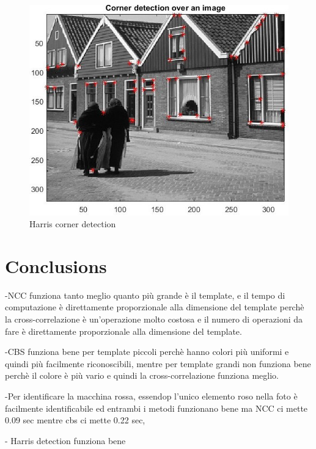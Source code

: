 \begin{figure}
	\centering
	\includegraphics[width=0.7\linewidth]{"mainmatter/Images/Corner detection over image"}
	\caption{Harris corner detection}
	\label{fig:corner-detection-over-image}
\end{figure}
\newpage
\section*{Conclusions}


-NCC funziona tanto meglio quanto più grande è il template, e il tempo di computazione è direttamente proporzionale alla dimensione del template perchè la cross-correlazione è un'operazione molto costosa e il numero di operazioni da fare è direttamente proporzionale alla dimensione del template.

-CBS funziona bene per template piccoli perchè hanno colori più uniformi e quindi più facilmente riconoscibili, mentre per template grandi non funziona bene perchè il colore è più vario e quindi la cross-correlazione funziona meglio.

-Per identificare la macchina rossa, essendop l'unico elemento roso nella foto  è facilmente identificabile ed entrambi i metodi funzionano bene ma NCC ci mette 0.09 sec mentre cbs ci mette 0.22 sec, 

- Harris detection funziona bene

